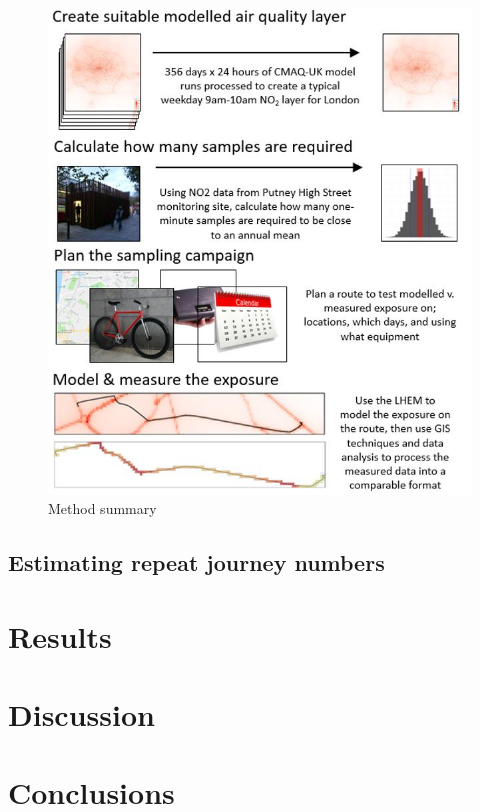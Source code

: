 \begin{figure}[H]
\centering
\includegraphics[scale=0.8]{images/comparison_method_summary.jpg}
\caption{Method summary}
\label{fig:comparison_method_summary}
\end{figure}

\subsection{Estimating repeat journey numbers}
\label{evaluation_journey_numbers}


\section{Results}
\label{sec:4results}


\section{Discussion}
\label{sec:4Discussion}


\section{Conclusions}
\label{sec:4conclusions}
